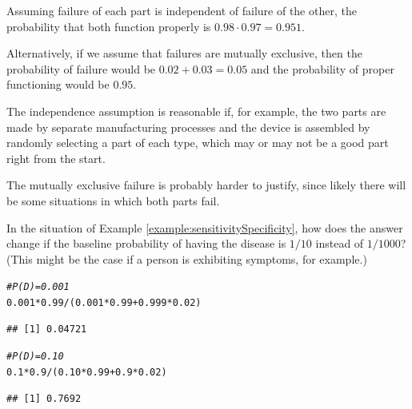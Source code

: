 \documentclass[twoside]{book}\usepackage[]{graphicx}\usepackage[]{xcolor}
\makeatletter
\newcommand{\hlnum}[1]{\textcolor[rgb]{0.686,0.059,0.569}{#1}}%
\newcommand{\hlcom}[1]{\textcolor[rgb]{0.678,0.584,0.686}{\textit{#1}}}%
\newcommand{\hlopt}[1]{\textcolor[rgb]{0,0,0}{#1}}%
\newcommand{\hlstd}[1]{\textcolor[rgb]{0.345,0.345,0.345}{#1}}%
\newenvironment{kframe}{%
 \def\at@end@of@kframe{}%
 \ifinner\ifhmode%
  \def\at@end@of@kframe{\end{minipage}}%
  \begin{minipage}{\columnwidth}%
 \fi\fi%
 \def\FrameCommand##1{\hskip\@totalleftmargin \hskip-\fboxsep
 \colorbox{shadecolor}{##1}\hskip-\fboxsep
     \hskip-\linewidth \hskip-\@totalleftmargin \hskip\columnwidth}%
 \MakeFramed {\advance\hsize-\width
   \@totalleftmargin\z@ \linewidth\hsize
   \@setminipage}}%
 {\par\unskip\endMakeFramed%
 \at@end@of@kframe}
\newenvironment{knitrout}{}{} %
\newcounter{example}[section]
\makeatother
\begin{document}
\begin{solution}
	Assuming failure of each part is independent of failure of the other,
	the probability that both function properly is 
	$0.98 \cdot 0.97 = 0.951$.
	
	Alternatively, if we assume that failures are mutually exclusive, then the probability of 
	failure would be $0.02 + 0.03 = 0.05$ and the probability of proper functioning would be 
	$0.95$.
	
	The independence assumption is reasonable if, for example, the two parts are made 
	by separate manufacturing processes and the device is assembled by randomly selecting a 
	part of each type, which may or may not be a good part right from the start.  
	
	The mutually exclusive failure is probably harder to justify, since likely there will
	be some situations in which both parts fail.
\end{solution}

\begin{problem}
In the situation of Example \ref{example:sensitivitySpecificity},
how does the answer change if the baseline probability of having 
the disease is $1/10$ instead of $1/1000$? (This might be the case 
if a person is exhibiting symptoms, for example.)
\end{problem}


\begin{solution}
\begin{knitrout}
\color{fgcolor}\begin{kframe}
\begin{alltt}
\hlcom{# P(D) = 0.001}
\hlnum{0.001} \hlopt{*} \hlnum{0.99} \hlopt{/} \hlstd{(}\hlnum{0.001} \hlopt{*} \hlnum{0.99} \hlopt{+} \hlnum{0.999} \hlopt{*} \hlnum{0.02}\hlstd{)}
\end{alltt}
\begin{verbatim}
## [1] 0.04721
\end{verbatim}
\begin{alltt}
\hlcom{# P(D) = 0.10}
\hlnum{0.1} \hlopt{*} \hlnum{0.9} \hlopt{/} \hlstd{(}\hlnum{0.10} \hlopt{*} \hlnum{0.99} \hlopt{+} \hlnum{0.9} \hlopt{*} \hlnum{0.02}\hlstd{)}
\end{alltt}
\begin{verbatim}
## [1] 0.7692
\end{verbatim}
\end{kframe}
\end{knitrout}
\end{solution}
\end{document}
